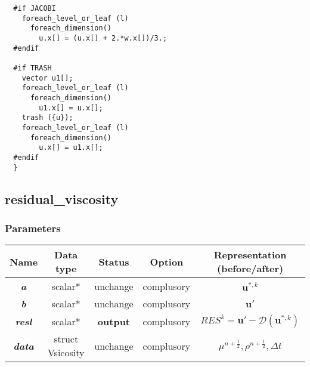 \documentclass[a4paper]{article}
\newcommand{\func}[1]{\textbf{\textcolor{function}{#1}}}
\newcommand{\para}[1]{\textbf{\emph{\textcolor{para}{#1}}}}
\begin{document}
\begin{multicols}{2}
  \columnbreak
  \begin{verbatim}
  #if JACOBI
    foreach_level_or_leaf (l)
      foreach_dimension()
        u.x[] = (u.x[] + 2.*w.x[])/3.;
  #endif
  
  #if TRASH
    vector u1[];
    foreach_level_or_leaf (l)
      foreach_dimension()
        u1.x[] = u.x[];
    trash ({u});
    foreach_level_or_leaf (l)
      foreach_dimension()
        u.x[] = u1.x[];
  #endif
  }
  \end{verbatim}
\end{multicols}

\subsection{\func{residual\_viscosity}}\label{sec:resi}
\subsubsection{Parameters}
\begin{center}
  \begin{tabular}{|c|c|c|c|c|}
    \hline
    Name & Data type & Status & Option & Representation (before/after)\\[0.5ex]
    \hline\hline
    \para{a} & scalar* & unchange & complusory & $ \mathbf{u}^{*,k}$\\
    \hline
    \para{b} & scalar* & unchange & complusory & $ \mathbf{u}'$\\
    \hline
    \rowcolor{output}\para{resl} & scalar* & \textbf{output} & complusory & $RES^k = \mathbf{u}'- \mathscr{D}( \mathbf{u}^{*,k})$\\
    \hline
    \para{data} & struct Vsicosity & unchange & complusory & $\mu^ {n+\frac{1}{2}}, \rho^{n+\frac{1}{2}}, \Delta t$ \\
    \hline
  \end{tabular}
\end{center}
\end{document}
